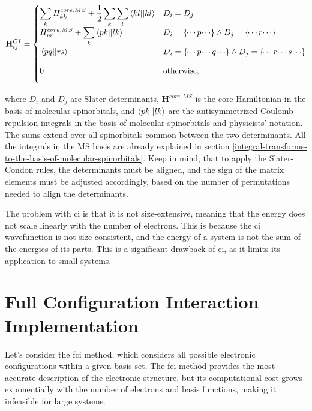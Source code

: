 \documentclass[open=any,parskip=half,11pt]{scrbook}
\begin{document}
\begin{equation}\label{eq:slater-condon-rules}
\mathbf{H}_{ij}^{CI}=
\begin{cases} 
\displaystyle \sum_kH_{kk}^{core,MS}+\frac{1}{2}\sum_k\sum_l\braket{kl||kl}&D_i=D_j \\
\displaystyle H_{pr}^{core,MS}+\sum_k\braket{pk||lk}&D_i=\left\lbrace\dotsi p\dotsi\right\rbrace\land D_j=\left\lbrace\dotsi r\dotsi\right\rbrace \\
\displaystyle \vphantom{\sum_k}\braket{pq||rs}&D_i=\left\lbrace\dotsi p\dotsi q\dotsi\right\rbrace\land D_j=\left\lbrace\dotsi r\dotsi s\dotsi\right\rbrace \\
\displaystyle \vphantom{\sum_k}0&\text{otherwise},
\end{cases}
\end{equation}

where \(D_i\) and \(D_j\) are Slater determinants, \(\mathbf{H}^{core,MS}\) is the core Hamiltonian in the basis of molecular spinorbitals, and \(\braket{pk||lk}\) are the antisymmetrized Coulomb repulsion integrals in the basis of molecular spinorbitals and physicists' notation. The sums extend over all spinorbitals common between the two determinants. All the integrals in the MS basis are already explained in section \ref{integral-transforms-to-the-basis-of-molecular-spinorbitals}. Keep in mind, that to apply the Slater-Condon rules, the determinants must be aligned, and the sign of the matrix elements must be adjusted accordingly, based on the number of permutations needed to align the determinants.

The problem with \acrshort{ci} is that it is not size-extensive, meaning that the energy does not scale linearly with the number of electrons. This is because the \acrshort{ci} wavefunction is not size-consistent, and the energy of a system is not the sum of the energies of its parts. This is a significant drawback of \acrshort{ci}, as it limits its application to small systems.

\section{Full Configuration Interaction Implementation}\label{full-configuration-interaction-implementation}

Let's consider the \acrshort{fci} method, which considers all possible electronic configurations within a given basis set. The \acrshort{fci} method provides the most accurate description of the electronic structure, but its computational cost grows exponentially with the number of electrons and basis functions, making it infeasible for large systems.
\end{document}
